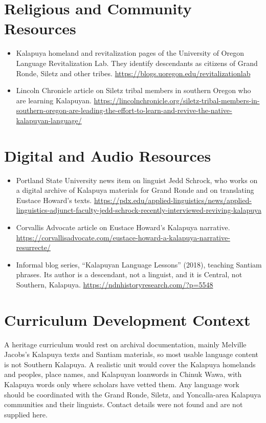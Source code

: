\documentclass[12pt]{article}
\begin{document}
\section{Religious and Community Resources}
\begin{itemize}
\item Kalapuya homeland and revitalization pages of the University of Oregon Language Revitalization Lab. They identify descendants as citizens of Grand Ronde, Siletz and other tribes. \url{https://blogs.uoregon.edu/revitalizationlab}
\item Lincoln Chronicle article on Siletz tribal members in southern Oregon who are learning Kalapuyan. \url{https://lincolnchronicle.org/siletz-tribal-members-in-southern-oregon-are-leading-the-effort-to-learn-and-revive-the-native-kalapuyan-language/}
\end{itemize}

\section{Digital and Audio Resources}
\begin{itemize}
\item Portland State University news item on linguist Jedd Schrock, who works on a digital archive of Kalapuya materials for Grand Ronde and on translating Eustace Howard's texts. \url{https://pdx.edu/applied-linguistics/news/applied-linguistics-adjunct-faculty-jedd-schrock-recently-interviewed-reviving-kalapuya}
\item Corvallis Advocate article on Eustace Howard's Kalapuya narrative. \url{https://corvallisadvocate.com/eustace-howard-a-kalapuya-narrative-resurrecte/}
\item Informal blog series, ``Kalapuyan Language Lessons'' (2018), teaching Santiam phrases. Its author is a descendant, not a linguist, and it is Central, not Southern, Kalapuya. \url{https://ndnhistoryresearch.com/?p=5548}
\end{itemize}

\section{Curriculum Development Context}
A heritage curriculum would rest on archival documentation, mainly Melville Jacobs's Kalapuya texts and Santiam materials, so most usable language content is not Southern Kalapuya. A realistic unit would cover the Kalapuya homelands and peoples, place names, and Kalapuyan loanwords in Chinuk Wawa, with Kalapuya words only where scholars have vetted them. Any language work should be coordinated with the Grand Ronde, Siletz, and Yoncalla-area Kalapuya communities and their linguists. Contact details were not found and are not supplied here.
\end{document}
